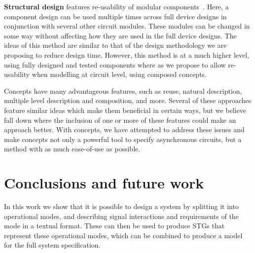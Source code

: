 \documentclass[british,compsoc]{IEEEtran}
\begin{document}
\textbf{Structural design} features re-usability of modular components~\cite{modular-circuit-design}.
Here, a component design can be used multiple times across full device
designs in conjunction with several other circuit modules. These modules
can be changed in some way without affecting how they are used in
the full device designs. The ideas of this method are similar to that
of the design methodology we are proposing to reduce design time.
However, this method is at a much higher level, using fully designed
and tested components where as we propose to allow re-usability when
modelling at circuit level, using composed concepts.

Concepts have many advantageous features, such as reuse, natural description, multiple level description and composition, and more.
Several of these approaches feature similar ideas which make them beneficial in certain ways,
but we believe fall down where the inclusion of one or more of these features could make an approach better. With concepts,
we have attempted to address these issues and make concepts not only a powerful tool to specify asynchronous circuits, but a method with as much ease-of-use as possible.


\section{Conclusions and future work\label{sec:conclusions}}

In this work we show that it is possible to design a system by splitting
it into operational modes, and describing signal interactions and requirements
of the mode in a textual format. These can then be used to produce STGs
that represent these operational modes, which can be combined to
produce a model for the full system specification.
\end{document}
